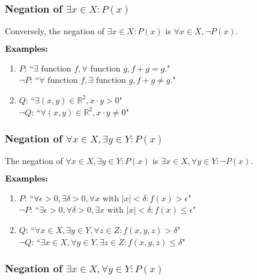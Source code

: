 \documentclass{article}
\begin{document}
\newpage
\subsubsection{Negation of $\exists x \in X \colon P(x)$}

Conversely, the negation of $\exists x \in X \colon P(x)$ is $\forall x \in X, \lnot P(x)$.

$\hfill \break \textbf{Examples:}$

\begin{enumerate}
    \item $P$: ``$\exists \text{ function } f, \forall \text{ function } g, f + g = g.$" \\
    $\lnot P$: ``$\forall \text { function } f, \exists \text{ function } g, f + g \not = g.$"

    \item $Q$: ``$\exists (x, y) \in \mathbb{R}^2, x \cdot y > 0$" \\
    $\lnot Q$: ``$\forall (x, y) \in \mathbb{R}^2, x \cdot y \not = 0$"
\end{enumerate}

\subsubsection{Negation of $\forall x \in X, \exists y \in Y \colon P(x)$}

The negation of $\forall x \in X, \exists y \in Y \colon P(x)$ is $\exists x \in X, \forall y \in Y \colon \lnot P(x)$.

$\hfill \break \textbf{Examples:}$

\begin{enumerate}
    \item $P$: ``$\forall \epsilon > 0, \exists \delta > 0, \forall x \text{ with } | x | < \delta \colon f(x) > \epsilon$" \\
    $\lnot P$: ``$\exists \epsilon > 0, \forall \delta > 0, \exists x \text { with } | x | < \delta \colon f(x) \leq \epsilon$"

    \item $Q$: ``$\forall x \in X, \exists y \in Y, \forall z \in Z \colon f(x, y, z) > \delta$" \\
    $\lnot Q$: ``$\exists x \in X, \forall y \in Y, \exists z \in Z \colon f(x, y, z) \leq \delta$"
\end{enumerate}

\subsubsection{Negation of $\exists x \in X, \forall y \in Y \colon P(x)$}
\end{document}
